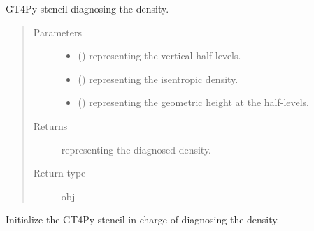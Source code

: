 \documentclass[letterpaper,10pt,english]{sphinxmanual}
\begin{document}
\begin{fulllineitems}
\begin{fulllineitems}
\end{fulllineitems}


\begin{fulllineitems}
\label{\detokenize{api:tasmania.dycore.diagnostic_isentropic.DiagnosticIsentropic._stencil_diagnosing_air_density_defs}}
GT4Py stencil diagnosing the density.
\begin{quote}\begin{description}
\item[{Parameters}] \leavevmode\begin{itemize}
\item {} 
 () \textendash{}  representing the vertical half levels.

\item {} 
 () \textendash{}  representing the isentropic density.

\item {} 
 () \textendash{}  representing the geometric height at the half-levels.

\end{itemize}

\item[{Returns}] \leavevmode
{} representing the diagnosed density.

\item[{Return type}] \leavevmode
obj

\end{description}\end{quote}

\end{fulllineitems}


\begin{fulllineitems}
\label{\detokenize{api:tasmania.dycore.diagnostic_isentropic.DiagnosticIsentropic._stencil_diagnosing_air_density_initialize}}
Initialize the GT4Py stencil in charge of diagnosing the density.


\end{fulllineitems}
\end{fulllineitems}
\end{document}
